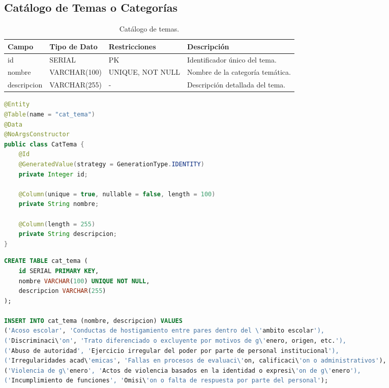 \subsection{Cat\'alogo de Temas o Categor\'ias}

\begin{table}[H]
\centering
\small
\begin{tabularx}{\textwidth}{|l|l|l|X|}
\hline
\rowcolor{azulESCOM} 
\color{white}\textbf{Campo} & \color{white}\textbf{Tipo de Dato} & \color{white}\textbf{Restricciones} & \color{white}\textbf{Descripci\'on} \\ \hline
id & SERIAL & PK & Identificador \'unico del tema. \\ \hline
nombre & VARCHAR(100) & UNIQUE, NOT NULL & Nombre de la categor\'ia tem\'atica. \\ \hline
descripcion & VARCHAR(255) & - & Descripci\'on detallada del tema. \\ \hline
\end{tabularx}
\caption{Cat\'alogo de temas.}
\label{tab:dict_cat_tema}
\end{table}

\begin{lstlisting}[language=Java, caption={Entidad Java para cat\'alogo de temas.}, label={lst:java_cat_tema}]
@Entity
@Table(name = "cat_tema")
@Data
@NoArgsConstructor
public class CatTema {
    @Id
    @GeneratedValue(strategy = GenerationType.IDENTITY)
    private Integer id;
    
    @Column(unique = true, nullable = false, length = 100)
    private String nombre;
    
    @Column(length = 255)
    private String descripcion;
}
\end{lstlisting}

\begin{lstlisting}[language=SQL, caption={Script de creaci\'on e inicializaci\'on del cat\'alogo de temas.}, label={lst:sql_cat_tema}]
CREATE TABLE cat_tema (
    id SERIAL PRIMARY KEY,
    nombre VARCHAR(100) UNIQUE NOT NULL,
    descripcion VARCHAR(255)
);

INSERT INTO cat_tema (nombre, descripcion) VALUES 
('Acoso escolar', 'Conductas de hostigamiento entre pares dentro del \'ambito escolar'),
('Discriminaci\'on', 'Trato diferenciado o excluyente por motivos de g\'enero, origen, etc.'),
('Abuso de autoridad', 'Ejercicio irregular del poder por parte de personal institucional'),
('Irregularidades acad\'emicas', 'Fallas en procesos de evaluaci\'on, calificaci\'on o administrativos'),
('Violencia de g\'enero', 'Actos de violencia basados en la identidad o expresi\'on de g\'enero'),
('Incumplimiento de funciones', 'Omisi\'on o falta de respuesta por parte del personal');
\end{lstlisting}

